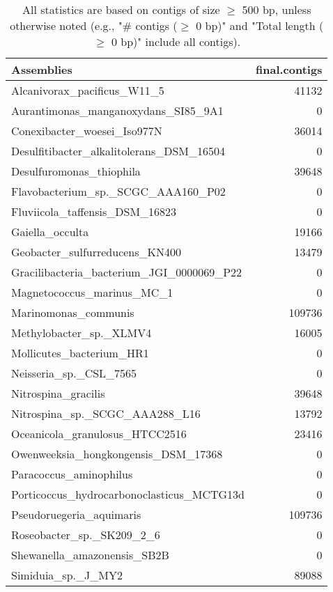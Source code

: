 \documentclass[12pt,a4paper]{article}
\begin{document}
\begin{table}[ht]
\begin{center}
\caption{All statistics are based on contigs of size $\geq$ 500 bp, unless otherwise noted (e.g., "\# contigs ($\geq$ 0 bp)" and "Total length ($\geq$ 0 bp)" include all contigs).}
\begin{tabular}{|l*{1}{|r}|}
\hline
Assemblies & final.contigs \\ \hline
Alcanivorax\_pacificus\_W11\_5 & 41132 \\ \hline
Aurantimonas\_manganoxydans\_SI85\_9A1 & 0 \\ \hline
Conexibacter\_woesei\_Iso977N & 36014 \\ \hline
Desulfitibacter\_alkalitolerans\_DSM\_16504 & 0 \\ \hline
Desulfuromonas\_thiophila & 39648 \\ \hline
Flavobacterium\_sp.\_SCGC\_AAA160\_P02 & 0 \\ \hline
Fluviicola\_taffensis\_DSM\_16823 & 0 \\ \hline
Gaiella\_occulta & 19166 \\ \hline
Geobacter\_sulfurreducens\_KN400 & 13479 \\ \hline
Gracilibacteria\_bacterium\_JGI\_0000069\_P22 & 0 \\ \hline
Magnetococcus\_marinus\_MC\_1 & 0 \\ \hline
Marinomonas\_communis & 109736 \\ \hline
Methylobacter\_sp.\_XLMV4 & 16005 \\ \hline
Mollicutes\_bacterium\_HR1 & 0 \\ \hline
Neisseria\_sp.\_CSL\_7565 & 0 \\ \hline
Nitrospina\_gracilis & 39648 \\ \hline
Nitrospina\_sp.\_SCGC\_AAA288\_L16 & 13792 \\ \hline
Oceanicola\_granulosus\_HTCC2516 & 23416 \\ \hline
Owenweeksia\_hongkongensis\_DSM\_17368 & 0 \\ \hline
Paracoccus\_aminophilus & 0 \\ \hline
Porticoccus\_hydrocarbonoclasticus\_MCTG13d & 0 \\ \hline
Pseudoruegeria\_aquimaris & 109736 \\ \hline
Roseobacter\_sp.\_SK209\_2\_6 & 0 \\ \hline
Shewanella\_amazonensis\_SB2B & 0 \\ \hline
Simiduia\_sp.\_J\_MY2 & 89088 \\ \hline

\end{tabular}
\end{center}
\end{table}
\end{document}
